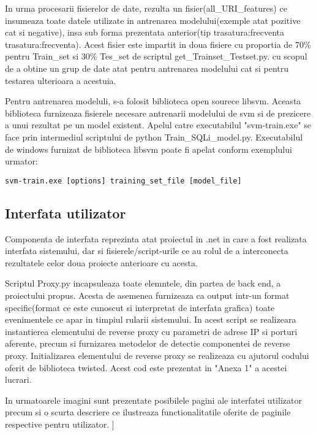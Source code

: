 In urma procesarii fisierelor de date, rezulta un fisier(all\_URI\_features) ce insumeaza toate datele utilizate in antrenarea modelului(exemple atat pozitive cat si negative), insa sub forma prezentata anterior(tip trasatura:frecventa trasatura:frecventa). Acest fisier este impartit in doua fisiere cu proportia de 70\% pentru Train\_set si 30\% Tes\_set de scriptul get\_Trainset\_Testset.py. cu scopul de a obtine un grup de date atat pentru antrenarea modelului cat si pentru testarea ulterioara a acestuia.

Pentru antrenarea modeluli, s-a folosit biblioteca open sourece libsvm. Aceasta biblioteca furnizeaza fisierele necesare antrenarii modelului de svm si de prezicere a unui rezultat pe un model existent. Apelul catre executabilul "svm-train.exe" se face prin intermediul scriptului de python Train\_SQLi\_model.py.
Executabilul de windows furnizat de biblioteca libsvm poate fi apelat conform exemplului urmator:

\begin{lstlisting} 
svm-train.exe [options] training_set_file [model_file]
\end{lstlisting}

\subsection{Interfata utilizator}

Componenta de interfata reprezinta atat proiectul in .net in care a fost realizata interfata sistemului, dar si fisierele/script-urile ce au rolul de a interconecta rezultatele celor doua proiecte anterioare cu acesta.

Scriptul Proxy.py incapsuleaza toate elemntele, din partea de back end, a proiectului propus. Acesta de asemenea furnizeaza ca output intr-un format specific(format ce este cunoscut si interpretat de interfata grafica) toate evenimentele ce apar in timpiul rularii sistemului. In acest script se realizeara instantierea elementului de reverse proxy cu parametri de adrese IP si porturi aferente, precum si furnizarea metodelor de detectie componentei de reverse proxy. Initializarea elementului de reverse proxy se realizeaza cu ajutorul codului oferit de biblioteca twisted. Acest cod este prezentat in "Anexa 1" a acestei lucrari.

In urmatoarele imagini sunt prezentate posibilele pagini ale interfatei utilizator precum si o scurta descriere ce ilustreaza functionalitatile oferite de paginile respective pentru utilizator.
\newpage]
 
